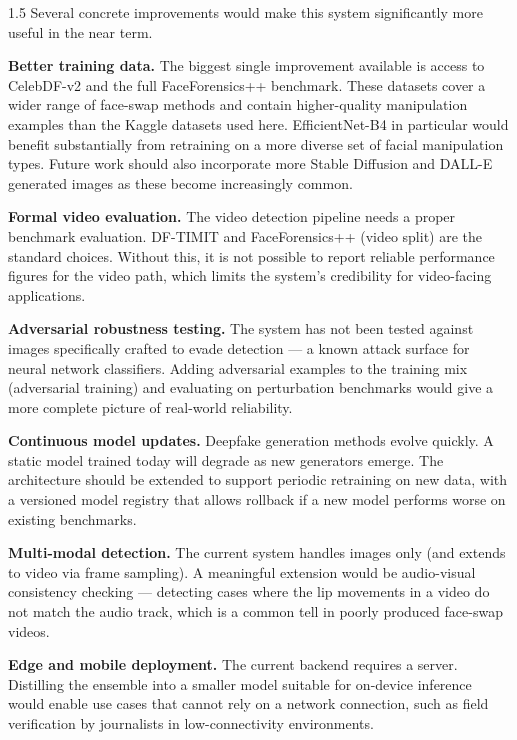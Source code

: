 \begin{spacing}{1.5}
Several concrete improvements would make this system significantly more useful in the near term.

\noindent\textbf{Better training data.}\quad
The biggest single improvement available is access to CelebDF-v2 and the full FaceForensics++ benchmark. These datasets cover a wider range of face-swap methods and contain higher-quality manipulation examples than the Kaggle datasets used here. EfficientNet-B4 in particular would benefit substantially from retraining on a more diverse set of facial manipulation types. Future work should also incorporate more Stable Diffusion and DALL-E generated images as these become increasingly common.

\noindent\textbf{Formal video evaluation.}\quad
The video detection pipeline needs a proper benchmark evaluation. DF-TIMIT and FaceForensics++ (video split) are the standard choices. Without this, it is not possible to report reliable performance figures for the video path, which limits the system's credibility for video-facing applications.

\noindent\textbf{Adversarial robustness testing.}\quad
The system has not been tested against images specifically crafted to evade detection --- a known attack surface for neural network classifiers. Adding adversarial examples to the training mix (adversarial training) and evaluating on perturbation benchmarks would give a more complete picture of real-world reliability.

\noindent\textbf{Continuous model updates.}\quad
Deepfake generation methods evolve quickly. A static model trained today will degrade as new generators emerge. The architecture should be extended to support periodic retraining on new data, with a versioned model registry that allows rollback if a new model performs worse on existing benchmarks.

\noindent\textbf{Multi-modal detection.}\quad
The current system handles images only (and extends to video via frame sampling). A meaningful extension would be audio-visual consistency checking --- detecting cases where the lip movements in a video do not match the audio track, which is a common tell in poorly produced face-swap videos.

\noindent\textbf{Edge and mobile deployment.}\quad
The current backend requires a server. Distilling the ensemble into a smaller model suitable for on-device inference would enable use cases that cannot rely on a network connection, such as field verification by journalists in low-connectivity environments.
\end{spacing}

